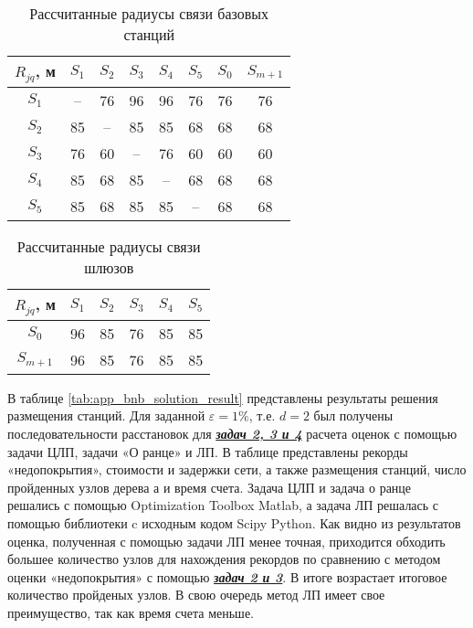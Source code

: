 \begin{table}[h!]\centering
  \begin{tabular}{|c|c c c c c c c|}\hline
      
      $R_{jq}$, м&	$S_1$& $S_2$& $S_3$& $S_4$& $S_5$& $S_0$& $S_{m+1}$\\
      \hline
      $S_1$& --&	76&	96&	96&	76&	76&	76\\
      $S_2$& 85&	--&	85&	85&	68&	68&	68\\
      $S_3$& 76&	60&	--&	76&	60&	60&	60\\
      $S_4$& 85&	68&	85&	--&	68&	68&	68\\
      $S_5$& 85&	68&	85&	85&	--&	68&	68\\

      \hline
\end{tabular}\caption{Рассчитанные радиусы связи базовых станций}\label{tab:app_sta_link}
\end{table}

\begin{table}[h!]\centering
  \begin{tabular}{|c|c c c c c|}\hline
      
      $R_{jq}$, м&	$S_1$& $S_2$& $S_3$& $S_4$& $S_5$ \\
      \hline
      $S_0$& 96&	85&	76&	85&	85\\
      $S_{m+1}$& 96&	85&	76&	85&	85\\
      \hline
\end{tabular}\caption{Рассчитанные радиусы связи шлюзов}\label{tab:app_gateway_link}
\end{table}


В таблице \cref{tab:app_bnb_solution_result} представлены результаты решения размещения станций. Для заданной $\varepsilon=1\%$, т.е. $d=2$ был получены последовательности расстановок для \underline{\textit{\textbf{задач 2, 3 и 4}}} расчета оценок с помощью задачи ЦЛП, задачи «О ранце» и ЛП. В таблице представлены рекорды «недопокрытия», стоимости и задержки сети, а также размещения станций, число пройденных узлов дерева а и время счета.
Задача ЦЛП и задача о ранце решались с помощью Optimization Toolbox Matlab, а задача ЛП решалась с помощью библиотеки c исходным кодом Scipy Python. Как видно из результатов оценка, полученная с помощью задачи ЛП менее точная, приходится обходить большее количество узлов для нахождения рекордов по сравнению с методом оценки «недопокрытия» с помощью \underline{\textit{\textbf{задач 2 и 3}}}. В итоге возрастает итоговое количество пройденых узлов. В свою очередь метод ЛП имеет свое преимущество, так как время счета меньше.


